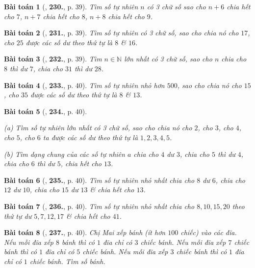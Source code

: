 \documentclass{article}
\numberwithin{equation}{section}
\newtheorem{baitoan}{Bài toán}[section]
\begin{document}
\begin{baitoan}[\cite{Binh_Toan_6_tap_1}, \textbf{230.}, p. 39]
	Tìm số tự nhiên $n$ có 3 chữ số sao cho $n + 6$ chia hết cho $7$, $n + 7$ chia hết cho $8$, $n + 8$ chia hết cho $9$.
\end{baitoan}

\begin{baitoan}[\cite{Binh_Toan_6_tap_1}, \textbf{231.}, p. 39]
	Tìm số tự nhiên có 3 chữ số, sao cho chia nó cho $17$, cho $25$ được các số dư theo thứ tự là $8$ \& $16$.
\end{baitoan}

\begin{baitoan}[\cite{Binh_Toan_6_tap_1}, \textbf{232.}, p. 39]
	Tìm $n\in\mathbb{N}$ lớn nhất có 3 chữ số, sao cho $n$ chia cho $8$ thì dư $7$, chia cho $31$ thì dư $28$.
\end{baitoan}

\begin{baitoan}[\cite{Binh_Toan_6_tap_1}, \textbf{233.}, p. 40]
	Tìm số tự nhiên nhỏ hơn $500$, sao cho chia nó cho $15$, cho $35$ được các số dư theo thứ tự là $8$ \& $13$.
\end{baitoan}

\begin{baitoan}[\cite{Binh_Toan_6_tap_1}, \textbf{234.}, p. 40]
	\begin{enumerate*}
		\item[(a)] Tìm số tự nhiên lớn nhất có 3 chữ số, sao cho chia nó cho $2$, cho $3$, cho $4$, cho $5$, cho $6$ ta được các số dư theo thứ tự là $1,2,3,4,5$.
		\item[(b)] Tìm dạng chung của các số tự nhiên $a$ chia cho $4$ dư $3$, chia cho $5$ thì dư $4$, chia cho $6$ thì dư $5$, chia hết cho $13$.
	\end{enumerate*}
\end{baitoan}

\begin{baitoan}[\cite{Binh_Toan_6_tap_1}, \textbf{235.}, p. 40]
	Tìm số tự nhiên nhỏ nhất chia cho $8$ dư $6$, chia cho $12$ dư $10$, chia cho $15$ dư $13$ \& chia hết cho $13$.
\end{baitoan}

\begin{baitoan}[\cite{Binh_Toan_6_tap_1}, \textbf{236.}, p. 40]
	Tìm số tự nhiên nhỏ nhất chia cho $8,10,15,20$ theo thứ tự dư $5,7,12,17$ \& chia hết cho $41$.
\end{baitoan}

\begin{baitoan}[\cite{Binh_Toan_6_tap_1}, \textbf{237.}, p. 40]
	Chị Mai xếp bánh (ít hơn $100$ chiếc) vào các đĩa. Nếu mỗi đĩa xếp $8$ bánh thì có $1$ đĩa chỉ có $3$ chiếc bánh. Nếu mỗi đĩa xếp $7$ chiếc bánh thì có $1$ đĩa chỉ có $5$ chiếc bánh. Nếu mỗi đĩa xếp $3$ chiếc bánh thì có $1$ đĩa chỉ có $1$ chiếc bánh. Tìm số bánh.
\end{baitoan}
\end{document}
